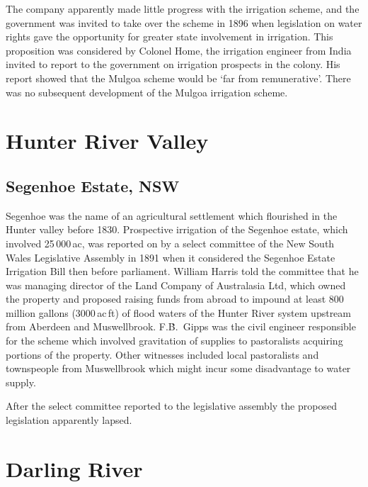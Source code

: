 The company apparently made little progress with the irrigation
scheme, and the government was invited to take over the scheme in 1896
when legislation on water rights gave the opportunity for greater
state involvement in irrigation.  This proposition was considered by
Colonel Home, the irrigation engineer from India invited to report to
the government on irrigation prospects in the colony.  His report
showed that the Mulgoa scheme would be `far from remunerative'.  There
was no subsequent development of the Mulgoa irrigation scheme.

\section*{Hunter River Valley}

\subsection*{Segenhoe Estate, NSW}

Segenhoe was the name of an agricultural settlement which flourished
in the Hunter valley before 1830.  Prospective irrigation of the
Segenhoe estate, which involved 25\,000\,ac, was reported on by a
select committee of the New South Wales Legislative Assembly in 1891
when it considered the Segenhoe Estate Irrigation Bill then before
parliament.  William Harris told the committee that he was managing
director of the Land Company of Australasia Ltd, which owned the
property and proposed raising funds from abroad to impound at least
800 million gallons (3000\,ac\,ft) of flood waters of the Hunter River
system upstream from Aberdeen and Muswellbrook.  F.\.B.~Gipps was the
civil engineer responsible for the scheme which involved gravitation
of supplies to pastoralists acquiring portions of the property.  Other
witnesses included local pastoralists and townspeople from
Muswellbrook which might incur some disadvantage to water supply.

After the select committee reported to the legislative assembly the
proposed legislation apparently lapsed.

\section*{Darling River}

